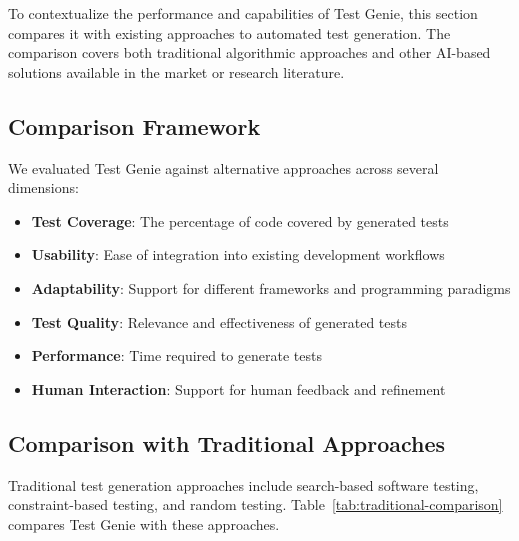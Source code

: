To contextualize the performance and capabilities of Test Genie, this section compares it with existing approaches to automated test generation. The comparison covers both traditional algorithmic approaches and other AI-based solutions available in the market or research literature.

\subsection{Comparison Framework}

We evaluated Test Genie against alternative approaches across several dimensions:

\begin{itemize}
    \item \textbf{Test Coverage}: The percentage of code covered by generated tests
    \item \textbf{Usability}: Ease of integration into existing development workflows
    \item \textbf{Adaptability}: Support for different frameworks and programming paradigms
    \item \textbf{Test Quality}: Relevance and effectiveness of generated tests
    \item \textbf{Performance}: Time required to generate tests
    \item \textbf{Human Interaction}: Support for human feedback and refinement
\end{itemize}

\subsection{Comparison with Traditional Approaches}

Traditional test generation approaches include search-based software testing, constraint-based testing, and random testing. Table~\ref{tab:traditional-comparison} compares Test Genie with these approaches.

